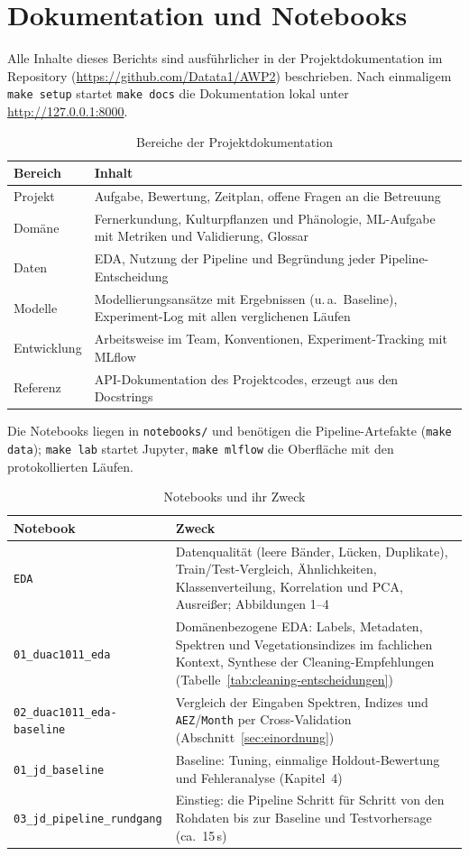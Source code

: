 \documentclass[11pt,a4paper]{article}
\begin{document}
\section{Dokumentation und Notebooks}

Alle Inhalte dieses Berichts sind ausführlicher in der Projektdokumentation im Repository
(\url{https://github.com/Datata1/AWP2}) beschrieben. Nach einmaligem \texttt{make setup} startet
\texttt{make docs} die Dokumentation lokal unter \url{http://127.0.0.1:8000}.

\begin{table}[H]
\centering
\caption{Bereiche der Projektdokumentation}
\small
\begin{tabularx}{\textwidth}{l X}
\toprule
Bereich & Inhalt \\
\midrule
Projekt & Aufgabe, Bewertung, Zeitplan, offene Fragen an die Betreuung \\
Domäne & Fernerkundung, Kulturpflanzen und Phänologie, ML-Aufgabe mit Metriken und Validierung,
  Glossar \\
Daten & EDA, Nutzung der Pipeline und Begründung jeder Pipeline-Entscheidung \\
Modelle & Modellierungsansätze mit Ergebnissen (u.\,a.\ Baseline), Experiment-Log mit allen
  verglichenen Läufen \\
Entwicklung & Arbeitsweise im Team, Konventionen, Experiment-Tracking mit MLflow \\
Referenz & API-Dokumentation des Projektcodes, erzeugt aus den Docstrings \\
\bottomrule
\end{tabularx}
\end{table}

Die Notebooks liegen in \texttt{notebooks/} und benötigen die Pipeline-Artefakte
(\texttt{make data}); \texttt{make lab} startet Jupyter, \texttt{make mlflow} die Oberfläche
mit den protokollierten Läufen.

\begin{table}[H]
\centering
\caption{Notebooks und ihr Zweck}
\small
\begin{tabularx}{\textwidth}{l X}
\toprule
Notebook & Zweck \\
\midrule
\texttt{EDA} & Datenqualität (leere Bänder, Lücken, Duplikate), Train/Test-Vergleich,
  Ähnlichkeiten, Klassenverteilung, Korrelation und PCA, Ausreißer; Abbildungen 1--4 \\
\texttt{01\_duac1011\_eda} & Domänenbezogene EDA: Labels, Metadaten, Spektren und
  Vegetationsindizes im fachlichen Kontext, Synthese der Cleaning-Empfehlungen
  (Tabelle~\ref{tab:cleaning-entscheidungen}) \\
\texttt{02\_duac1011\_eda-baseline} & Vergleich der Eingaben Spektren, Indizes und
  \texttt{AEZ}/\texttt{Month} per Cross-Validation (Abschnitt~\ref{sec:einordnung}) \\
\texttt{01\_jd\_baseline} & Baseline: Tuning, einmalige Holdout-Bewertung und Fehleranalyse
  (Kapitel~4) \\
\texttt{03\_jd\_pipeline\_rundgang} & Einstieg: die Pipeline Schritt für Schritt von den
  Rohdaten bis zur Baseline und Testvorhersage (ca.\ 15\,s) \\
\bottomrule
\end{tabularx}
\end{table}
\end{document}
